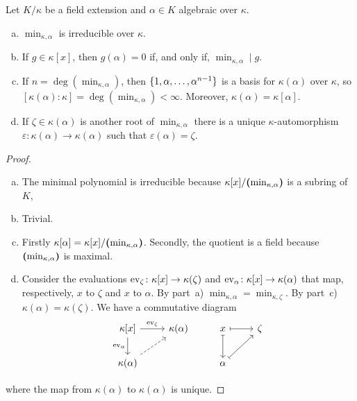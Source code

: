 \begin{prop}\label{prop:algebraic-minimal}
    Let $K/\kappa$ be a field extension and $\alpha\in K$ algebraic over $\kappa$.
    \begin{enumerate}[a), font=\upshape]
        \item $\min_{\kappa,\alpha}$ is irreducible over $\kappa$.
        
        \item If $g\in\kappa[x]$, then $g(\alpha)=0$ if, and only if, $\min_{\kappa,\alpha}\mid g$.

        \item If $n=\deg(\min_{\kappa,\alpha})$, then $\{1,\alpha,\dots, \alpha^{n-1}\}$ is a basis for $\kappa(\alpha)$ over $\kappa$, so $[\kappa(\alpha): \kappa]=\deg(\min_{\kappa,\alpha})<\infty$. Moreover, $\kappa(\alpha)=\kappa[\alpha]$.

        \item If $\zeta\in\kappa(\alpha)$ is another root of $\min_{\kappa,\alpha}$ there is a unique $\kappa$-automorphism $\varepsilon\colon\kappa(\alpha)\to\kappa(\alpha)$ such that $\varepsilon(\alpha)=\zeta$. 
    \end{enumerate}
\end{prop}

\begin{proof}${}$
    \begin{enumerate}[a), font=\upshape]
        \item The minimal polynomial is irreducible because $\kappa[x]/\textrm{\boldmath$($}\!\min_{\kappa,\alpha}\!\textrm{\boldmath$)$}$ is a subring of~$K$, 

        \item Trivial.

        \item Firstly $\kappa[\alpha]=\kappa[x]/\textrm{\boldmath$($}\!\min_{\kappa,\alpha}\!\textrm{\boldmath$)$}$. Secondly, the quotient is a field because $\textrm{\boldmath$($}\!\min_{\kappa,\alpha}\!\textrm{\boldmath$)$}$ is maximal.

        \item Consider the evaluations ${\rm ev}_{\zeta}\colon\kappa[x]\to\kappa(\zeta)$ and ${\rm ev}_{\alpha}\colon\kappa[x]\to\kappa(\alpha)$ that map, respectively, $x$ to $\zeta$ and $x$ to $\alpha$. By part~a) $\min_{\kappa,\alpha}=\min_{\kappa,\zeta}$. By part~c) $\kappa(\alpha)=\kappa(\zeta)$. We have a commutative diagram
        $$
            \begin{tikzcd}
                {\kappa[x]}
                        \arrow[r,"\ev\zeta"]
                        \arrow[d,"\ev\alpha"']
                    &\kappa(\alpha)
                    &x
                        \arrow[r,mapsto]
                        \arrow[d,mapsto]
                    &\zeta\\
                \kappa(\alpha)
                        \arrow[ru,dashed]
                    &&\alpha
                        \arrow[ru,mapsto]&
            \end{tikzcd}
        $$
    \end{enumerate}
    where the map from $\kappa(\alpha)$ to $\kappa(\alpha)$ is unique.
\end{proof}

